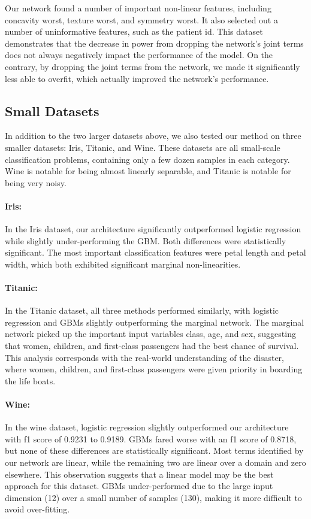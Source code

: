 Our network found a number of important non-linear features, including concavity worst, texture worst, and symmetry worst. It also selected out a number of uninformative features, such as the patient id. This dataset demonstrates that the decrease in power from dropping the network's joint terms does not always negatively impact the performance of the model. On the contrary, by dropping the joint terms from the network, we made it significantly less able to overfit, which actually improved the network's performance. 

\subsection{Small Datasets}

In addition to the two larger datasets above, we also tested our method on three smaller datasets: Iris, Titanic, and Wine. These datasets are all small-scale classification problems, containing only a few dozen samples in each category. Wine is notable for being almost linearly separable, and Titanic is notable for being very noisy.

\paragraph{Iris:} In the Iris dataset, our architecture significantly outperformed logistic regression while slightly under-performing the GBM. Both differences were statistically significant. The most important classification features were petal length and petal width, which both exhibited significant marginal non-linearities. 

\paragraph{Titanic:} In the Titanic dataset, all three methods performed similarly, with logistic regression and GBMs slightly outperforming the marginal network. The marginal network picked up the important input variables class, age, and sex, suggesting that women, children, and first-class passengers had the best chance of survival. This analysis corresponds with the real-world understanding of the disaster, where women, children, and first-class passengers were given priority in boarding the life boats.

\paragraph{Wine:} In the wine dataset, logistic regression slightly outperformed our architecture with f1 score of 0.9231 to 0.9189. GBMs fared worse with an f1 score of 0.8718, but none of these differences are statistically significant. Most terms identified by our network are linear, while the remaining two are linear over a domain and zero elsewhere. This observation suggests that a linear model may be the best approach for this dataset. GBMs under-performed due to the large input dimension (12) over a small number of samples (130), making it more difficult to avoid over-fitting.

